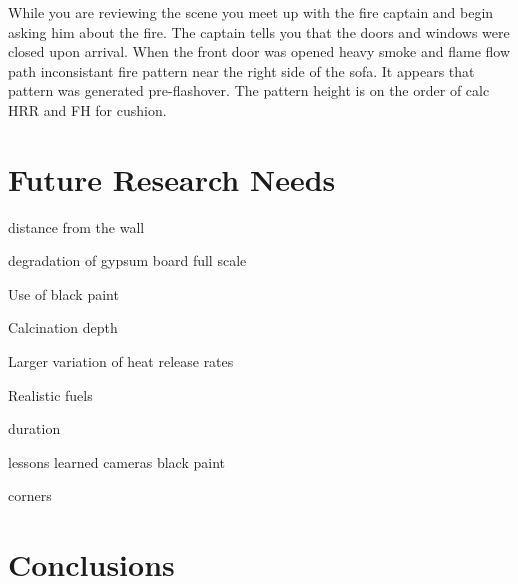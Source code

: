 \documentclass[twoside]{uocthesis}
\begin{document}
While you are reviewing the scene you meet up with the fire captain and begin asking him about the fire.  The captain tells you that the doors and windows were closed upon arrival.  When the front door was opened heavy smoke and flame 
flow path
inconsistant fire pattern near the right side of the sofa.  It appears that pattern was generated pre-flashover.  The pattern height is on the order of   calc HRR and FH for cushion.


\chapter{Future Research Needs}

distance from the wall

degradation of gypsum board full scale

Use of black paint

Calcination depth

Larger variation of heat release rates

Realistic fuels

duration

lessons learned  cameras   black paint

corners


\chapter{Conclusions}
\end{document}
